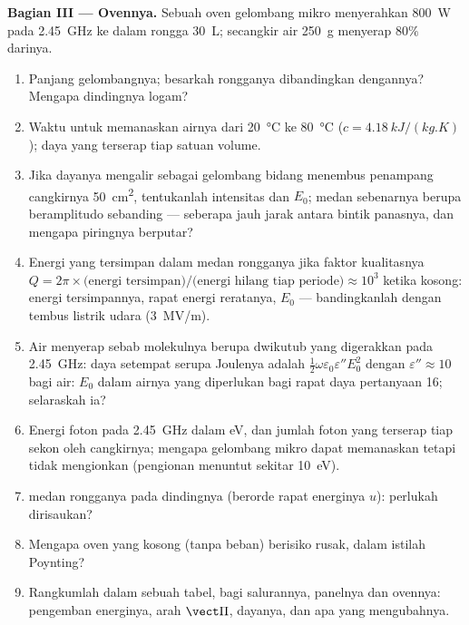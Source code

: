 \begin{problem}
\medskip
\noindent\textbf{Bagian III --- Ovennya.}
Sebuah oven gelombang mikro menyerahkan \qty{800}{W} pada \qty{2.45}{GHz} ke dalam rongga
\qty{30}{L}; secangkir air \qty{250}{g} menyerap $80\%$ darinya.
\begin{enumerate}[resume]
  \item Panjang gelombangnya; besarkah rongganya dibandingkan dengannya? Mengapa
        dindingnya logam?
  \item Waktu untuk memanaskan airnya dari \qty{20}{\degreeCelsius} ke \qty{80}{\degreeCelsius}
        ($c = \qty{4.18}{kJ/(kg.K)}$); daya yang terserap tiap satuan volume.
  \item Jika dayanya mengalir sebagai gelombang bidang menembus penampang
        cangkirnya \qty{50}{cm^2}, tentukanlah intensitas dan $E_0$; medan sebenarnya berupa
         beramplitudo sebanding --- seberapa jauh jarak
        antara bintik panasnya, dan mengapa piringnya berputar?
  \item Energi yang tersimpan dalam medan rongganya jika faktor kualitasnya
        $Q = 2\pi\times\text{(energi tersimpan)}/\text{(energi hilang tiap periode)}
        \approx 10^3$ ketika kosong: energi tersimpannya, rapat energi reratanya, $E_0$
        --- bandingkanlah dengan tembus listrik udara (\qty{3}{MV/m}).
  \item Air menyerap sebab molekulnya berupa dwikutub yang digerakkan pada
        \qty{2.45}{GHz}: daya setempat serupa Joulenya adalah $\tfrac12\omega\varepsilon_0
        \varepsilon''E_0^2$ dengan $\varepsilon'' \approx 10$ bagi air: $E_0$ dalam airnya
        yang diperlukan bagi rapat daya pertanyaan 16; selaraskah ia?
  \item Energi foton pada \qty{2.45}{GHz} dalam eV, dan jumlah foton
        yang terserap tiap sekon oleh cangkirnya; mengapa gelombang mikro dapat memanaskan tetapi
        tidak mengionkan (pengionan menuntut sekitar \qty{10}{eV}).
  \item {} medan rongganya pada dindingnya (berorde
        rapat energinya $u$): perlukah dirisaukan?
  \item Mengapa oven yang kosong (tanpa beban) berisiko rusak, dalam
        istilah Poynting?
  \item Rangkumlah dalam sebuah tabel, bagi salurannya, panelnya dan ovennya: pengemban
        energinya, arah $\vect\Pi$, dayanya, dan apa yang
        mengubahnya.
\end{enumerate}
\end{problem}
